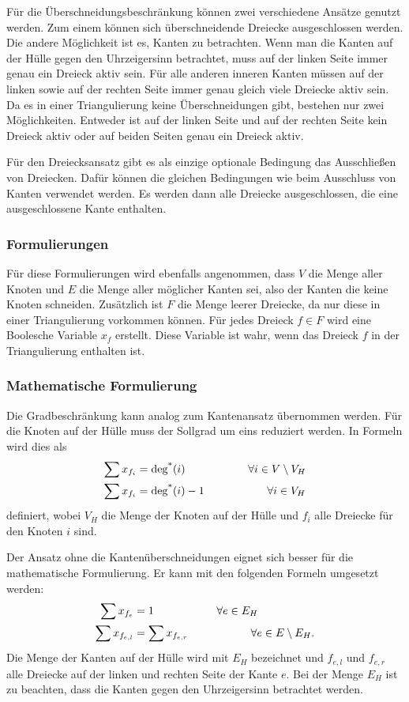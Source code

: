 Für die Überschneidungsbeschränkung können zwei verschiedene Ansätze genutzt werden.
Zum einem können sich überschneidende Dreiecke ausgeschlossen werden.
Die andere Möglichkeit ist es, Kanten zu betrachten.
Wenn man die Kanten auf der Hülle gegen den Uhrzeigersinn betrachtet, muss auf der linken Seite immer genau ein Dreieck aktiv sein.
Für alle anderen inneren Kanten müssen auf der linken sowie auf der rechten Seite immer genau gleich viele Dreiecke aktiv sein.
Da es in einer Triangulierung keine Überschneidungen gibt, bestehen nur zwei Möglichkeiten.
Entweder ist auf der linken Seite und auf der rechten Seite kein Dreieck aktiv oder auf beiden Seiten genau ein Dreieck aktiv.


Für den Dreiecksansatz gibt es als einzige optionale Bedingung das Ausschließen von Dreiecken.
Dafür können die gleichen Bedingungen wie beim Ausschluss von Kanten verwendet werden.
Es werden dann alle Dreiecke ausgeschlossen, die eine ausgeschlossene Kante enthalten.

\subsubsection{Formulierungen}
Für diese Formulierungen wird ebenfalls angenommen, dass \(V\) die Menge aller Knoten und \(E\) die Menge aller möglicher Kanten sei, also der Kanten die keine Knoten schneiden.
Zusätzlich ist \(F\) die Menge leerer Dreiecke, da nur diese in einer Triangulierung vorkommen können.
Für jedes Dreieck \(f \in F\) wird eine Boolesche Variable \(x_f\) erstellt.
Diese Variable ist wahr, wenn das Dreieck \(f\) in der Triangulierung enthalten ist.

\subsubsection{Mathematische Formulierung}
\label{sec:dreiecks_formulierung:mathematisch}
Die Gradbeschränkung kann analog zum Kantenansatz übernommen werden.
Für die Knoten auf der Hülle muss der Sollgrad um eins reduziert werden.
In Formeln wird dies als
\begin{align*}
	\sum x_{f_i} &= \operatorname{deg^*}(i) \hspace{2cm} \forall i \in V \setminus V_H \\
	\sum x_{f_i} &= \operatorname{deg^*}(i) - 1 \hspace{2cm} \forall i \in V_H 
\end{align*}
definiert, wobei \(V_H\) die Menge der Knoten auf der Hülle und \(f_i\) alle Dreiecke für den Knoten \(i\) sind.

Der Ansatz ohne die Kantenüberschneidungen eignet sich besser für die mathematische Formulierung.
Er kann mit den folgenden Formeln umgesetzt werden:
\begin{align*}
	\sum x_{f_e} &= 1 \hspace{2cm} \forall e \in E_H \\
	\sum x_{f_{e,l}} &= \sum x_{f_{e,r}} \hspace{2cm} \forall e \in E \setminus E_H.
\end{align*}
Die Menge der Kanten auf der Hülle wird mit \(E_H\) bezeichnet und \(f_{e,l}\) und \(f_{e,r}\) alle Dreiecke auf der linken und rechten Seite der Kante \(e\).
Bei der Menge \(E_H\) ist zu beachten, dass die Kanten gegen den Uhrzeigersinn betrachtet werden.

